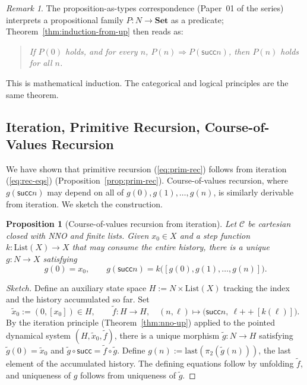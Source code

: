 \documentclass[12pt]{article}
\newtheorem{proposition}[theorem]{Proposition}
\theoremstyle{definition}
\theoremstyle{remark}
\newtheorem{remark}[theorem]{Remark}
\newcommand{\Set}{\mathbf{Set}}
\newcommand{\suc}{\mathsf{succ}}
\begin{document}
\begin{remark}
The proposition-as-types correspondence (Paper~01 of the series) interprets a propositional family $P \colon N \to \Set$ as a predicate; Theorem~\ref{thm:induction-from-up} then reads as:
\begin{quote}
\itshape
If $P(0)$ holds, and for every $n$, $P(n) \Rightarrow P(\suc n)$, then $P(n)$ holds for all $n$.
\end{quote}
This is mathematical induction. The categorical and logical principles are the same theorem.
\end{remark}

\subsection{Iteration, Primitive Recursion, Course-of-Values Recursion}

We have shown that primitive recursion (\ref{eq:prim-rec}) follows from iteration (\ref{eq:rec-eqs}) (Proposition~\ref{prop:prim-rec}). Course-of-values recursion, where $g(\suc n)$ may depend on all of $g(0), g(1), \dots, g(n)$, is similarly derivable from iteration. We sketch the construction.

\begin{proposition}[Course-of-values recursion from iteration]
\label{prop:cov}
Let $\mathcal{C}$ be cartesian closed with NNO and finite lists. Given $x_0 \in X$ and a step function $k \colon \mathrm{List}(X) \to X$ that may consume the entire history, there is a unique $g \colon N \to X$ satisfying
\[
g(0) = x_0, \qquad g(\suc n) = k\bigl([g(0), g(1), \dots, g(n)]\bigr).
\]
\end{proposition}

\begin{proof}[Sketch]
Define an auxiliary state space $H := N \times \mathrm{List}(X)$ tracking the index and the history accumulated so far. Set
\[
\widetilde{x}_0 := (0, [x_0]) \in H, \qquad \widetilde{f} \colon H \to H, \quad (n, \ell) \mapsto \bigl(\suc n,\ \ell \mathbin{+\!\!+} [k(\ell)]\bigr).
\]
By the iteration principle (Theorem~\ref{thm:nno-up}) applied to the pointed dynamical system $(H, \widetilde{x}_0, \widetilde{f})$, there is a unique morphism $\widetilde{g} \colon N \to H$ satisfying $\widetilde{g}(0) = \widetilde{x}_0$ and $\widetilde{g} \circ \suc = \widetilde{f} \circ \widetilde{g}$. Define $g(n) := \mathrm{last}(\pi_2(\widetilde{g}(n)))$, the last element of the accumulated history. The defining equations follow by unfolding $\widetilde{f}$, and uniqueness of $g$ follows from uniqueness of $\widetilde{g}$.
\end{proof}
\end{document}

